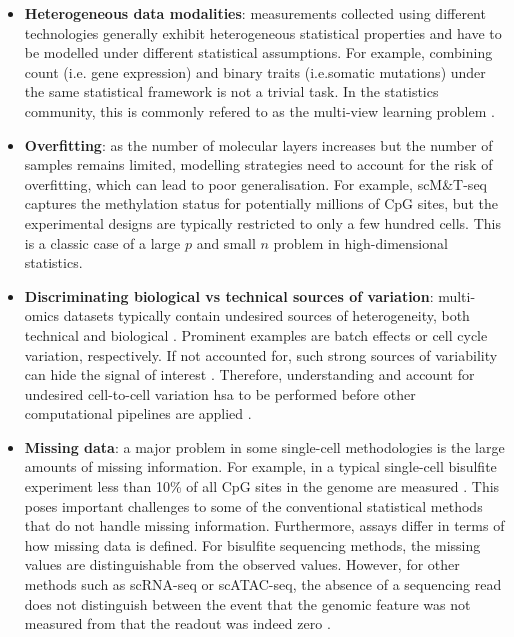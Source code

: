 \begin{itemize}
	\item \textbf{Heterogeneous data modalities}: measurements collected using different technologies generally exhibit heterogeneous statistical properties and have to be modelled under different statistical assumptions. For example, combining count (i.e. gene expression) and binary traits (i.e.somatic mutations) under the same statistical framework is not a trivial task. In the statistics community, this is commonly refered to as the multi-view learning problem \cite{Xu2013,Li2016}.

	\item \textbf{Overfitting}: as the number of molecular layers increases but the number of samples remains limited, modelling strategies need to account for the risk of overfitting, which can lead to poor generalisation. For example, scM\&T-seq captures the methylation status for potentially millions of CpG sites, but the experimental designs are typically restricted to only a few hundred cells. This is a classic case of a large $p$ and small $n$ problem in high-dimensional statistics.

	\item \textbf{Discriminating biological vs technical sources of variation}: multi-omics datasets typically contain undesired sources of heterogeneity, both technical and biological \cite{Ritchie2015}. Prominent examples are batch effects or cell cycle variation, respectively. If not accounted for, such strong sources of variability can hide the signal of interest \cite{Buettner2015}. Therefore, understanding and account for undesired cell-to-cell variation hsa to be performed before other computational pipelines are applied \cite{Meng2016}.

	\item \textbf{Missing data}: a major problem in some single-cell methodologies is the large amounts of missing information. For example, in a typical single-cell bisulfite experiment less than 10\% of all CpG sites in the genome are measured \cite{Smallwood2014}. This poses important challenges to some of the conventional statistical methods that do not handle missing information. Furthermore, assays differ in terms of how missing data is defined. For bisulfite sequencing methods, the missing values are distinguishable from the observed values. However, for other methods such as scRNA-seq or scATAC-seq, the absence of a sequencing read does not distinguish between the event that the genomic feature was not measured from that the readout was indeed zero \cite{Clark2018}. %


\end{itemize}
